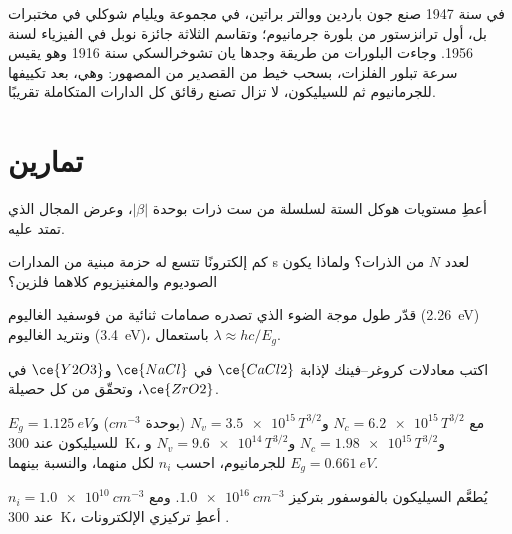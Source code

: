 \begin{history}
في سنة 1947 صنع جون باردين ووالتر براتين، في مجموعة ويليام شوكلي في مختبرات
بل، أول ترانزستور من بلورة جرمانيوم؛ وتقاسم الثلاثة
جائزة نوبل في الفيزياء لسنة 1956. وجاءت البلورات من طريقة وجدها يان
تشوخرالسكي سنة 1916 وهو يقيس سرعة تبلور الفلزات،
بسحب خيط من القصدير من المصهور: وهي، بعد تكييفها للجرمانيوم ثم للسيليكون،
لا تزال تصنع رقائق كل الدارات المتكاملة تقريبًا.
\end{history}

\section{تمارين}

\begin{exercise}[$\star$]\label{exo:b3:solid-state:1}
أعطِ مستويات هوكل الستة لسلسلة من ست ذرات بوحدة $|\beta|$، 
وعرض المجال الذي تمتد عليه.
\end{exercise}

\begin{exercise}[$\star$]\label{exo:b3:solid-state:2}
كم إلكترونًا تتسع له حزمة مبنية من المدارات s لعدد $N$ من الذرات؟ ولماذا
يكون الصوديوم والمغنيزيوم كلاهما فلزين؟
\end{exercise}

\begin{exercise}[$\star$]\label{exo:b3:solid-state:3}
قدّر طول موجة الضوء الذي تصدره صمامات ثنائية من فوسفيد الغاليوم
(\qty{2.26}{eV}) ونتريد الغاليوم (\qty{3.4}{eV})، باستعمال $\lambda \approx hc/E_g$.
\end{exercise}

\begin{exercise}[$\star$]\label{exo:b3:solid-state:4}
اكتب معادلات كروغر--فينك لإذابة $\ce{CaCl2}$ في $\ce{NaCl}$ و$\ce{Y2O3}$ في $\ce{ZrO2}$، 
وتحقّق من كل حصيلة.
\end{exercise}

\begin{exercise}[$\star\star$]\label{exo:b3:solid-state:5}
مع $N_c = \num{6.2e15}\,T^{3/2}$ و$N_v = \num{3.5e15}\,T^{3/2}$ (بوحدة $\unit{cm^{-3}}$) و$E_g = \qty{1.125}{eV}$ للسيليكون عند \qty{300}{K}،
و$N_c = \num{1.98e15}\,T^{3/2}$ و$N_v = \num{9.6e14}\,T^{3/2}$ و$E_g = \qty{0.661}{eV}$ للجرمانيوم، احسب $n_i$ لكل منهما، 
والنسبة بينهما.
\end{exercise}

\begin{exercise}[$\star\star$]\label{exo:b3:solid-state:6}
يُطعَّم السيليكون بالفوسفور بتركيز $\qty{1.0e16}{cm^{-3}}$. ومع $n_i = \qty{1.0e10}{cm^{-3}}$ عند \qty{300}{K}، أعطِ
تركيزي الإلكترونات .
\end{exercise}

